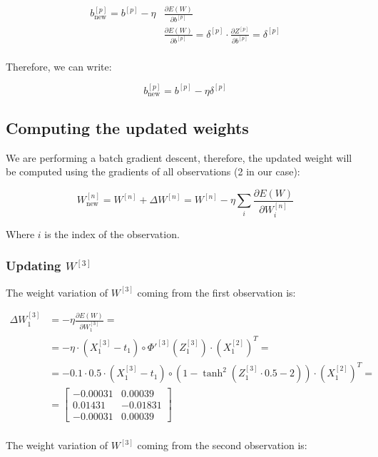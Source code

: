\documentclass{article}
\begin{document}
\begin{align*}
    b^{[p]}_{\text{new}} = b^{[p]} - \eta &\frac{\partial E(W)}{\partial b^{[p]}} \\
    &\frac{\partial E(W)}{\partial b^{[p]}} = \delta^{[p]} \cdot \frac{\partial Z^{[p]}}{\partial b^{[p]}} = \delta^{[p]} \\
\end{align*}

Therefore, we can write:

\[ b^{[p]}_{\text{new}} = b^{[p]} - \eta\delta^{[p]} \]

\subsection*{Computing the updated weights}

We are performing a batch gradient descent, therefore, the updated weight will be computed using the gradients of all observations (2 in our case):

\[ W^{[n]}_{\text{new}} = W^{[n]} +\Delta W^{[n]} = W^{[n]} - \eta \sum_i \frac{\partial E(W)}{\partial W^{[n]}_i} \]

Where $i$ is the index of the observation.

\subsubsection*{Updating $W^{[3]}$}

The weight variation of $W^{[3]}$ coming from the first observation is:

\begin{align*}
    \Delta W^{[3]}_1 &= - \eta \frac{\partial E(W)}{\partial W^{[3]}_1} = \\
    &= - \eta \cdot (X^{[3]}_1 - t_1) \circ \Phi'^{[3]}(Z^{[3]}_1)\cdot (X^{[2]}_1)^T =\\
    &= - 0.1 \cdot 0.5 \cdot (X^{[3]}_1 - t_1)  \circ \left( 1 - \tanh^2(Z^{[3]}_1 \cdot 0.5 - 2) \right) \cdot (X^{[2]}_1)^T = \\
    &= \begin{bmatrix} -0.00031 &  0.00039 \\   0.01431 & -0.01831 \\  -0.00031 &  0.00039  \end{bmatrix} \\
\end{align*}

The weight variation of $W^{[3]}$ coming from the second observation is:
\end{document}
